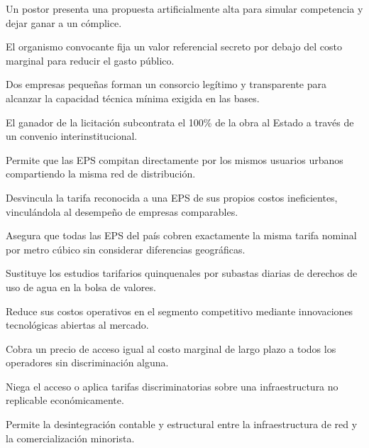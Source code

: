 \begin{opts}
    \item Un postor presenta una propuesta artificialmente alta para simular competencia y dejar ganar a un cómplice.
    \item El organismo convocante fija un valor referencial secreto por debajo del costo marginal para reducir el gasto público.
    \item Dos empresas pequeñas forman un consorcio legítimo y transparente para alcanzar la capacidad técnica mínima exigida en las bases.
    \item El ganador de la licitación subcontrata el 100\% de la obra al Estado a través de un convenio interinstitucional.
\end{opts}

\begin{opts}
    \item Permite que las EPS compitan directamente por los mismos usuarios urbanos compartiendo la misma red de distribución.
    \item Desvincula la tarifa reconocida a una EPS de sus propios costos ineficientes, vinculándola al desempeño de empresas comparables.
    \item Asegura que todas las EPS del país cobren exactamente la misma tarifa nominal por metro cúbico sin considerar diferencias geográficas.
    \item Sustituye los estudios tarifarios quinquenales por subastas diarias de derechos de uso de agua en la bolsa de valores.
\end{opts}

\begin{opts}
    \item Reduce sus costos operativos en el segmento competitivo mediante innovaciones tecnológicas abiertas al mercado.
    \item Cobra un precio de acceso igual al costo marginal de largo plazo a todos los operadores sin discriminación alguna.
    \item Niega el acceso o aplica tarifas discriminatorias sobre una infraestructura no replicable económicamente.
    \item Permite la desintegración contable y estructural entre la infraestructura de red y la comercialización minorista.
\end{opts}

